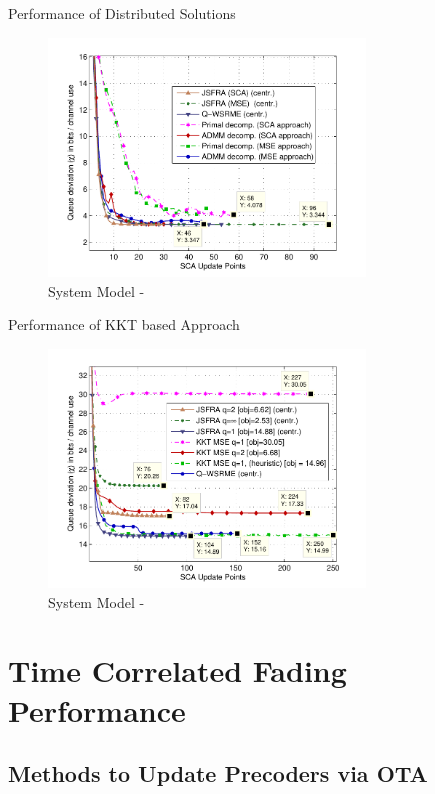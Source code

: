 \documentclass[9pt]{beamer}
\begin{document}
\begin{frame}{Performance of Distributed Solutions}
	\begin{figure}
		\centering
		\includegraphics[width=0.75\textwidth]{fig-3-2}
		\caption{System Model - }
	\end{figure}
\end{frame}

\begin{frame}{Performance of KKT based Approach}
	\begin{figure}
		\centering
		\includegraphics[width=0.75\textwidth]{fig-9-3}
		\caption{System Model - }
	\end{figure}
\end{frame}

\section{Time Correlated Fading Performance}

\subsection{Methods to Update Precoders via \acs{OTA}}
\end{document}
